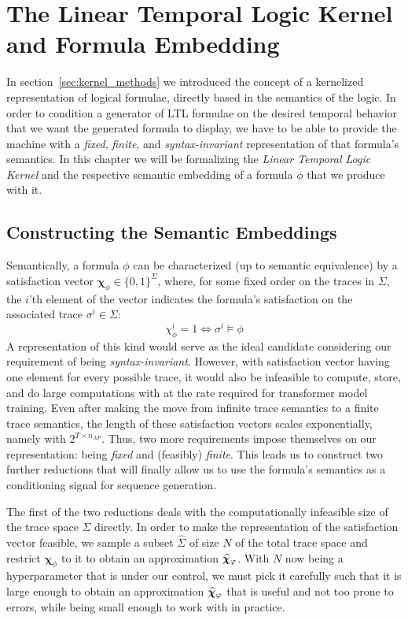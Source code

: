 \documentclass[titlepage,a4paper,11pt]{report}
\begin{document}
\chapter{The Linear Temporal Logic Kernel and Formula Embedding} \label{chap:kernel}
    In section~\ref{sec:kernel_methods} we introduced the concept of a kernelized representation of logical formulae, directly based in the semantics of the logic. In order to condition a  generator of LTL formulae on the desired temporal behavior that we want the generated formula to display, we have to be able to provide the machine with a \emph{fixed}, \emph{finite}, and \emph{syntax-invariant} representation of that formula's semantics. In this chapter we will be formalizing the \textit{Linear Temporal Logic Kernel} and the respective semantic embedding of a formula $\phi$ that we produce with it.

    \section{Constructing the Semantic Embeddings}
    Semantically, a formula $\phi$ can be characterized (up to semantic equivalence) by a satisfaction vector $\bm\chi_\phi \in \{0,1\}^\Sigma$, where, for some fixed order on the traces in $\Sigma$, the $i$'th element of the vector indicates the formula's satisfaction on the associated trace $\sigma^i \in \Sigma$:
    \begin{equation}
        \chi_\phi^i = 1 \iff \sigma^i \vDash \phi
    \end{equation}
    A representation of this kind would serve as the ideal candidate considering our requirement of being \emph{syntax-invariant}. However, with satisfaction vector having one element for every possible trace, it would also be infeasible to compute, store, and do large computations with at the rate required for transformer model training. Even after making the move from infinite trace semantics to a finite trace semantics, the length of these satisfaction vectors scales exponentially, namely with $2^{T\times n_{AP}}$. Thus, two more requirements impose themselves on our representation: being \emph{fixed} and (feasibly) \emph{finite}. This leads us to construct two further reductions that will finally allow us to use the formula's semantics as a conditioning signal for sequence generation.

    The first of the two reductions deals with the computationally infeasible size of the trace space $\Sigma$ directly. In order to make the representation of the satisfaction vector feasible, we sample a subset $\widehat \Sigma$ of size $N$ of the total trace space and restrict $\bm\chi_\phi$ to it to obtain an approximation $\bm{\widehat\chi}_\varphi$. With $N$ now being a hyperparameter that is under our control, we must pick it carefully such that it is large enough to obtain an approximation $\bm{\widehat\chi}_\varphi$ that is useful and not too prone to errors, while being small enough to work with in practice.
    
\end{document}
